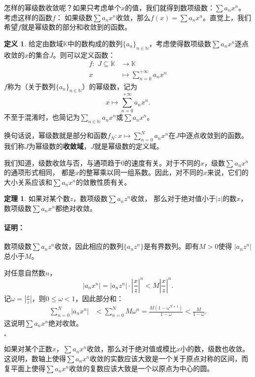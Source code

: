 \documentclass[12pt,UTF8]{ctexbook}
\theoremstyle{definition}
\newtheorem{df}{定义}[section]
\newtheorem{tm}{定理}[section]
\theoremstyle{plain}
\renewenvironment{proof}{\paragraph{\textbf{证明：}}}{\hfill$\square$}
\begin{document}
怎样的幂级数收敛呢？如果只考虑单个$x$的值，我们就得到数项级数：$\sum a_n x^n$。考虑这样的函数$f$：
如果级数$\sum a_n x^n$收敛，那么$f(x) = \sum a_n x^n$。直觉上，我们希望$f$就是幂级数的部分和收敛到的函数。

\begin{df}
    给定由数域$\mathbb{K}$中的数构成的数列$\{a_n\}_{n\in\mathbb{N}}$，考虑使得数项级数$\sum a_n x^n$逐点收敛的$x$的集合$J$。则可以定义函数：
    $$
    \begin{array}{rl}
        f: \,\, J\subseteq \mathbb{K} &\rightarrow \mathbb{K} \\
        x &\displaystyle \mapsto \sum_{n=0}^{+\infty} a_n x^n        
    \end{array}
    $$
    $f$称为（关于数列$\{a_n\}_{n\in\mathbb{N}}$）的幂级数，记为
    $$ x\mapsto \sum_{n=0}^{+\infty} a_n x^n. $$
    不至于混淆时，也简记为$\sum_{n\in\mathbb{N}} a_n x^n$或$\sum a_n x^n$。
\end{df}
换句话说，幂级数就是部分和函数$f_N : x\mapsto \sum_{n=0}^{N} a_n x^n$在$J$中逐点收敛到的函数。
我们称$J$为幂级数的\textbf{收敛域}，$J$就是幂级数的定义域。

我们知道，级数收敛与否，与通项趋于$0$的速度有关。对于不同的$x$，级数$\sum a_n x^n$的通项形式相同，
都是$x$的整幂乘以同一组系数。因此，对不同的$x$来说，它们的大小关系应该和$\sum a_n x^n$的敛散性质有关。

\begin{tm}\label{tm:1-1-0}
    如果对某个数$z$，数项级数$\sum a_n z^n$收敛，
    那么对于绝对值小于$|z|$的数$x$，数项级数$\sum a_n x^n$都绝对收敛。
\end{tm}

\begin{proof}
    数项级数$\sum a_n z^n$收敛，因此相应的数列$\{a_n z^n\}$是有界数列。即有$M>0$使得
    $|a_n z^n|$总小于$M$。

    对任意自然数$n$，
    $$ |a_n x^n| = |a_n z^n| \cdot \left|\frac{x}{z}\right|^n < M \left|\frac{x}{z}\right|^n. $$
    记$\displaystyle \omega = \left|\frac{x}{z}\right|$，则$0\leqslant \omega<1$，因此部分和：
    \begin{align*}
        \sum_{n=0}^N |a_n x^n| &< \sum_{n=0}^N M \omega^n = \frac{M(1 - \omega^{N+1})}{1 - \omega} < \frac{M}{1 - \omega}.
    \end{align*}
    这说明$\sum a_n x^n$绝对收敛。

\end{proof}

如果对某个正数$x$，$\sum a_n x^n$收敛，那么对于绝对值或模比$x$小的数，级数也收敛。
这说明，数轴上使得$\sum a_n x^n$收敛的实数应该大致是一个关于原点对称的区间，而复平面上使得$\sum a_n x^n$收敛的复数应该大致是一个以原点为中心的圆。
\end{document}
